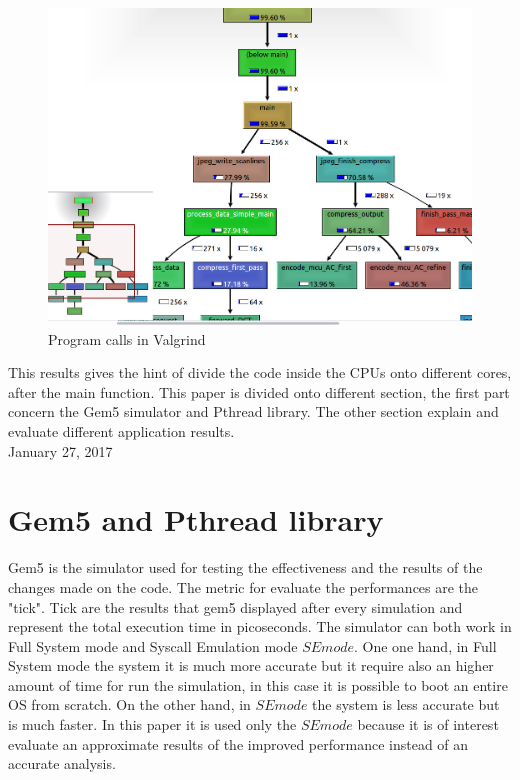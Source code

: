 \documentclass[journal]{IEEEtran}
\begin{document}
\begin{figure}[!h]
	\includegraphics[width=\linewidth]{valgrind}
	\caption{Program calls in Valgrind}
	\label{fig:valgrind}
\end{figure}

This results gives the hint of divide the code inside the CPUs onto different cores, after the main function. This paper is divided onto different section, the first part concern the Gem5 simulator and Pthread library. The other section explain and evaluate different application results.\\
 
\hfill January 27, 2017


\section{Gem5 and Pthread library}
Gem5 is the simulator used for testing the effectiveness and the results of the changes made on the code. The metric for evaluate the performances are the "tick". Tick are the results that gem5 displayed after every simulation and represent the total execution time in picoseconds. 
The simulator can both work in Full System mode and Syscall Emulation mode \(SE mode\). One one hand, in Full System mode the system it is much more accurate but it require also an higher amount of time for run the simulation, in this case it is possible to boot an entire OS from scratch. On the other hand, in \(SE mode\) the system is less accurate but is much faster.
In this paper it is used only the \(SE mode\) because it is of interest evaluate an approximate results of the improved performance instead of an accurate analysis.
\end{document}
